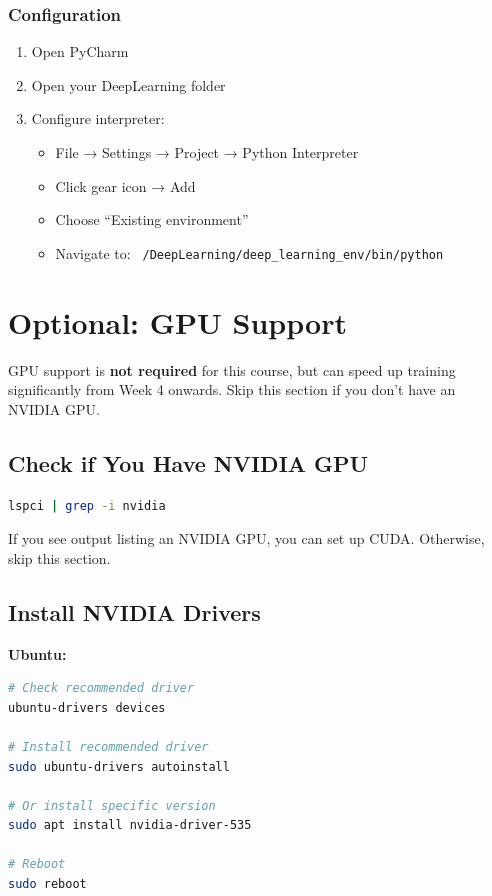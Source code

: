 \documentclass[11pt,a4paper]{article}
\begin{document}
\subsubsection{Configuration}

\begin{enumerate}
    \item Open PyCharm
    \item Open your DeepLearning folder
    \item Configure interpreter:
    \begin{itemize}
        \item File → Settings → Project → Python Interpreter
        \item Click gear icon → Add
        \item Choose ``Existing environment''
        \item Navigate to: \texttt{~/DeepLearning/deep\_learning\_env/bin/python}
    \end{itemize}
\end{enumerate}

\section{Optional: GPU Support}

\begin{infobox}
GPU support is \textbf{not required} for this course, but can speed up training significantly from Week 4 onwards. Skip this section if you don't have an NVIDIA GPU.
\end{infobox}

\subsection{Check if You Have NVIDIA GPU}

\begin{lstlisting}[language=bash]
lspci | grep -i nvidia
\end{lstlisting}

If you see output listing an NVIDIA GPU, you can set up CUDA. Otherwise, skip this section.

\subsection{Install NVIDIA Drivers}

\textbf{Ubuntu:}
\begin{lstlisting}[language=bash]
# Check recommended driver
ubuntu-drivers devices

# Install recommended driver
sudo ubuntu-drivers autoinstall

# Or install specific version
sudo apt install nvidia-driver-535

# Reboot
sudo reboot
\end{lstlisting}
\end{document}
